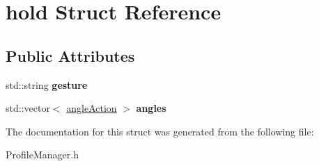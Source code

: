 \hypertarget{structhold}{\section{hold Struct Reference}
\label{structhold}
}
\subsection*{Public Attributes}
\begin{DoxyCompactItemize}
\item 
\hypertarget{structhold_a327925dd3da3b0efcf737fcd7fa43d4b}{std\+::string {\bfseries gesture}}\label{structhold_a327925dd3da3b0efcf737fcd7fa43d4b}

\item 
\hypertarget{structhold_a19b8b7d6dbc64ff80e75582738b70c83}{std\+::vector$<$ \hyperlink{structangle_action}{angle\+Action} $>$ {\bfseries angles}}\label{structhold_a19b8b7d6dbc64ff80e75582738b70c83}

\end{DoxyCompactItemize}


The documentation for this struct was generated from the following file\+:\begin{DoxyCompactItemize}
\item 
Profile\+Manager.\+h\end{DoxyCompactItemize}
